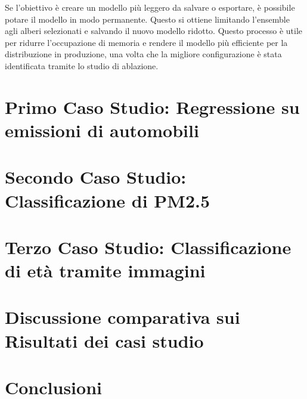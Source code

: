 \documentclass[a4paper,12pt]{report}
\begin{document}
	Se l'obiettivo è creare un modello più leggero da salvare o esportare, è possibile potare il modello in modo permanente. Questo si ottiene limitando l'ensemble agli alberi selezionati e salvando il nuovo modello ridotto. Questo processo è utile per ridurre l'occupazione di memoria e rendere il modello più efficiente per la distribuzione in produzione, una volta che la migliore configurazione è stata identificata tramite lo studio di ablazione.
	
	\chapter{Primo Caso Studio: Regressione su emissioni di automobili}
	
	\chapter{Secondo Caso Studio: Classificazione di PM2.5}
	
	\chapter{Terzo Caso Studio: Classificazione di età tramite immagini}
	
	\chapter{Discussione comparativa sui Risultati dei casi studio}
	
	\chapter{Conclusioni}
	
\end{document}
